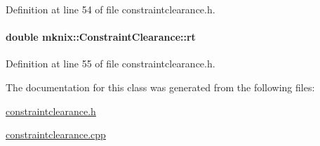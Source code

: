 Definition at line 54 of file constraintclearance.\+h.

\hypertarget{classmknix_1_1_constraint_clearance_a07e6a50d3416e2265e2dadb1bf730c43}{}
\paragraph[{rt}]{\setlength{\rightskip}{0pt plus 5cm}double mknix\+::\+Constraint\+Clearance\+::rt\hspace{0.3cm}{\ttfamily [protected]}}\label{classmknix_1_1_constraint_clearance_a07e6a50d3416e2265e2dadb1bf730c43}


Definition at line 55 of file constraintclearance.\+h.



The documentation for this class was generated from the following files\+:\begin{DoxyCompactItemize}
\item 
\hyperlink{constraintclearance_8h}{constraintclearance.\+h}\item 
\hyperlink{constraintclearance_8cpp}{constraintclearance.\+cpp}\end{DoxyCompactItemize}
